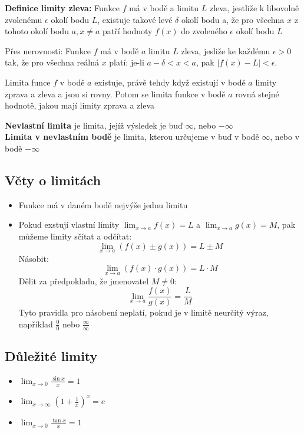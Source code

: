 \documentclass[12pt]{article}
\begin{document}
\textbf{Definice limity zleva:} Funkce $f$ má v bodě a limitu $L$ zleva, jestliže k libovolně zvolenému
$\epsilon$ okolí bodu $L$,
existuje takové levé
$\delta$ okolí bodu a, že pro všechna $x$ z tohoto okolí bodu $a, x\neq a$ patří
hodnoty $f(x)$ do zvoleného
$\epsilon$ okolí bodu $L$

Přes nerovnosti: Funkce $f$ má v bodě $a$ limitu $L$ zleva, jesliže ke každému $\epsilon >0$ tak, že pro všechna reálná $x$ platí: je-li $a-\delta<x<a$, pak $|f(x) - L|<\epsilon$.


Limita funce $f$ v bodě $a$ existuje, právě tehdy když existují v bodě $a$ limity zprava a zleva a jsou si rovny. Potom se limita funkce v bodě $a$ rovná stejné hodnotě, jakou mají limity zprava a zleva

\textbf{Nevlastní limita} je limita, jejíž výsledek je buď $\infty$, nebo $-\infty$\\
\textbf{Limita v nevlastním bodě} je limita, kterou určujeme v buď v bodě $\infty$, nebo v bodě $-\infty$

\subsection*{Věty o limitách}
\begin{itemize}[itemsep = 2pt]
    \item Funkce má v daném bodě nejvýše jednu limitu
    \item Pokud exstují vlastní limity $\lim_{x \to a}f(x) = L$ a $\lim_{x \to a}g(x) = M$, pak můžeme limity sčítat a odčítat:
    \[\lim_{x \to a}(f(x)\pm g(x)) = L\pm M\]
    Násobit:
    \[\lim_{x \to a}(f(x) \cdot g(x)) = L \cdot M\]
    Dělit za předpokladu, že jmenovatel $M\neq 0$:
    \[\lim_{x \to a}\frac{f(x)}{g(x)} = \frac{L}{M}\]
    Tyto pravidla pro násobení neplatí, pokud je v limitě neurčitý výraz, například $\frac{0}{0}$ nebo $\frac{\infty}{\infty}$
\end{itemize}


\subsection*{Důležité limity}
\begin{itemize}
    \item $\lim_{x \to 0} \frac{\sin x}{x} = 1$
    \item $\lim_{x \to \infty} (1+\frac{1}{x})^x = e$
    \item $\lim_{x \to 0} \frac{\tan x}{x} = 1$
\end{itemize}
\end{document}
